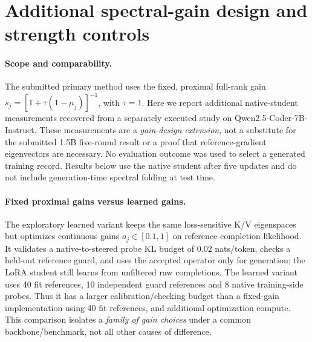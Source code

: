 %
%

\section{Additional spectral-gain design and strength controls}
\label{app:postreview-gains}

\paragraph{Scope and comparability.}
The submitted primary method uses the fixed, proximal full-rank gain
$s_j=[1+\tau(1-\mu_j)]^{-1}$, with $\tau=1$. Here we report additional
native-student measurements recovered from a separately executed study
on Qwen2.5-Coder-7B-Instruct. These measurements are a
\emph{gain-design extension}, not a substitute for the submitted
1.5B five-round result or a proof that reference-gradient eigenvectors
are necessary. No evaluation outcome was used to select a generated
training record. Results below use the native student after five
updates and do not include generation-time spectral folding at test time.

\paragraph{Fixed proximal gains versus learned gains.}
The exploratory learned variant keeps the same loss-sensitive K/V
eigenspaces but optimizes continuous gains $a_j\in[0.1,1]$ on reference
completion likelihood. It validates a native-to-steered probe KL
budget of $0.02$ nats/token, checks a held-out reference guard,
and uses the accepted operator only for generation; the LoRA student
still learns from unfiltered raw completions. The learned variant uses
40 fit references, 10 independent guard references and 8 native
training-side probes. Thus it has a larger calibration/checking budget
than a fixed-gain implementation using 40 fit references, and
additional optimization compute. This comparison isolates a
\emph{family of gain choices} under a common backbone/benchmark,
not all other causes of difference.

